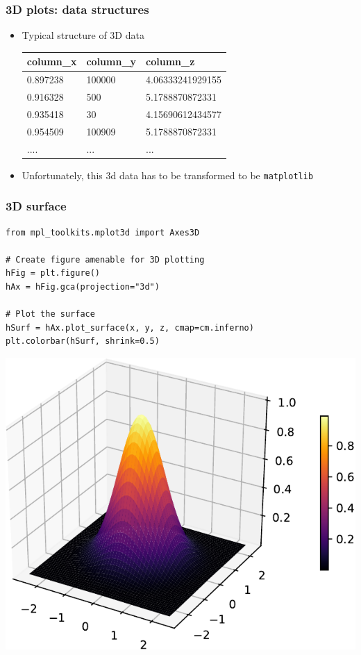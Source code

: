 \documentclass[xcolor=table]{beamer}
\begin{document}
\begin{frame}[fragile]
\frametitle{3D plots: data structures}
\begin{itemize}\addtolength{\itemsep}{\baselineskip}
    \item Typical structure of 3D data 
\begin{center}
    { \ttfamily
    \begin{tabular}{|l|l|l|}\hline
        column\_x & column\_y & column\_z \\ \hline
        0.897238 & 100000 & 4.06333241929155 \\
        0.916328 & 500 & 5.1788870872331 \\
        0.935418 & 30 & 4.15690612434577 \\
        0.954509 & 100909 & 5.1788870872331 \\
        .... & ... & ... \\ \hline
    \end{tabular}
    } 
\end{center}
    \pause
\item Unfortunately, this 3d data has to be transformed to be \texttt{matplotlib}
\end{itemize}
\end{frame}

\begin{frame}[fragile]
\frametitle{3D surface}

\tiny
\begin{lstlisting}[style=python]
from mpl_toolkits.mplot3d import Axes3D

# Create figure amenable for 3D plotting
hFig = plt.figure()
hAx = hFig.gca(projection="3d")

# Plot the surface
hSurf = hAx.plot_surface(x, y, z, cmap=cm.inferno)
plt.colorbar(hSurf, shrink=0.5)
\end{lstlisting}

\vspace{-0.8cm}
\begin{center}
	\includegraphics[width=.42\textwidth]{plot6.pdf}
\end{center}

\end{frame}





\end{document}
